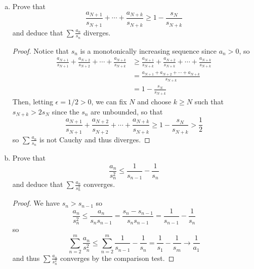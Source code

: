 \documentclass{scrbook}
\newcommand{\N}{\mathbb{N}}
\renewcommand{\to}{\rightarrow}
\begin{document}
\begin{enumerate}
\begin{enumerate}[(a)]
\begin{proof}
We prove the contrapositive. Let $b_n = \frac{a_n}{1 + a_n}$ and suppose $\sum b_n$ converges. Then we know $b_n \to 0$ so $1 - b_n = \frac{1}{1 + a_n} \to 1$. Thus for $0 < \epsilon < \frac{1}{2}$, there exists $N \in \N$ such that if $n \ge N$, 
\[
	\left|\frac{1}{1 + a_n} - 1\right| = \left| \frac{b_n}{a_n} - 1 \right| < \frac{1}{2}
\]
so $a_n < 2b_n$ if $n \ge N$. This implies that
\[
	\sum_{n = N}^{m} a_n < 2\sum_{n = N}^{m} b_n < M
\]
where $m \ge N$ and $M$ is a bound on the partial sums of $\sum b_n$ which exists since $\sum b_n$ converges. So the partial sums of $\sum a_n$ monotonically increasing and bounded above, so $\sum a_n$ converges.
\end{proof}
\item Prove that
\[
	\frac{a_{N+1}}{s_{N+1}} + \dotsb + \frac{a_{N+k}}{s_{N+k}} \ge 1 - \frac{s_N}{s_{N+k}}
\]
and deduce that $\sum \frac{a_n}{s_n}$ diverges.

\begin{proof}
Notice that $s_n$ is a monotonically increasing sequence since $a_n > 0$, so
\begin{align*}
\frac{a_{N+1}}{s_{N+1}} + \frac{a_{N+2}}{s_{N+2}} + \dotsb + \frac{a_{N+k}}{s_{N+k}} &\ge \frac{a_{N+1}}{s_{N+k}} + \frac{a_{N+2}}{s_{N+k}} + \dotsb + \frac{a_{N+k}}{s_{N+k}} \\
	&= \frac{a_{N+1} + a_{N+2} + \dotsb + a_{N+k}}{s_{N+k}} \\
	&= 1 - \frac{s_N}{s_{N+k}}
\end{align*}
Then, letting $\epsilon = 1/2 > 0$, we can fix $N$ and choose $k \ge N$ such that $s_{N+k} > 2s_N$ since the $s_n$ are unbounded, so that
\[
	\frac{a_{N+1}}{s_{N+1}} + \frac{a_{N+2}}{s_{N+2}} + \dotsb + \frac{a_{N+k}}{s_{N+k}} \ge 1 - \frac{s_N}{s_{N+k}} > \frac12
\]
so $\sum \frac{a_n}{s_n}$ is not Cauchy and thus diverges.
\end{proof}
\item Prove that
\[
	\frac{a_n}{s_n^2} \le \frac{1}{s_{n-1}} - \frac{1}{s_n}
\]
and deduce that $\sum \frac{a_n}{s_n^2}$ converges.

\begin{proof}
We have $s_n > s_{n-1}$ so
\[
	\frac{a_n}{s_n^2} \le \frac{a_n}{s_n s_{n-1}} = \frac{s_n - s_{n-1}}{s_n s_{n-1}} = \frac{1}{s_{n-1}} - \frac{1}{s_n}
\]
so
\[
	\sum_{n=2}^{m} \frac{a_n}{s_n^2} \le \sum_{n=2}^{m} \frac{1}{s_{n-1}} - \frac{1}{s_n} = \frac{1}{s_1} - \frac{1}{s_m} \to \frac{1}{a_1}
\]
and thus $\sum \frac{a_n}{s_n^2}$ converges by the comparison test.
\end{proof}


\end{enumerate}
\end{enumerate}
\end{document}
